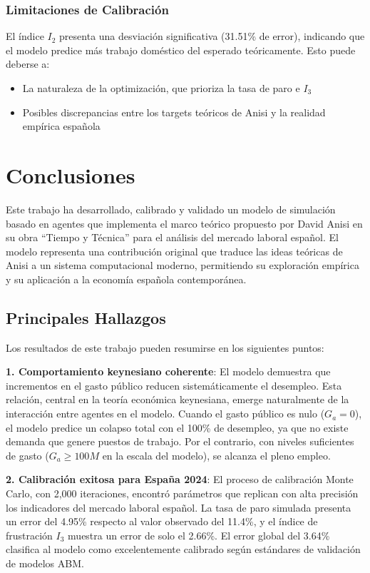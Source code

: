 \subsubsection{Limitaciones de Calibración}

El índice $I_2$ presenta una desviación significativa (31.51\% de error), indicando que el modelo predice más trabajo doméstico del esperado teóricamente. Esto puede deberse a:
\begin{itemize}
    \item La naturaleza de la optimización, que prioriza la tasa de paro e $I_3$
    \item Posibles discrepancias entre los targets teóricos de Anisi y la realidad empírica española
\end{itemize}


\section{Conclusiones}

Este trabajo ha desarrollado, calibrado y validado un modelo de simulación basado en agentes que implementa el marco teórico propuesto por David Anisi en su obra ``Tiempo y Técnica'' para el análisis del mercado laboral español. El modelo representa una contribución original que traduce las ideas teóricas de Anisi a un sistema computacional moderno, permitiendo su exploración empírica y su aplicación a la economía española contemporánea.

\subsection{Principales Hallazgos}

Los resultados de este trabajo pueden resumirse en los siguientes puntos:

\textbf{1. Comportamiento keynesiano coherente}: El modelo demuestra que incrementos en el gasto público reducen sistemáticamente el desempleo. Esta relación, central en la teoría económica keynesiana, emerge naturalmente de la interacción entre agentes en el modelo. Cuando el gasto público es nulo ($G_a = 0$), el modelo predice un colapso total con el 100\% de desempleo, ya que no existe demanda que genere puestos de trabajo. Por el contrario, con niveles suficientes de gasto ($G_a \geq 100M$ en la escala del modelo), se alcanza el pleno empleo.

\textbf{2. Calibración exitosa para España 2024}: El proceso de calibración Monte Carlo, con 2,000 iteraciones, encontró parámetros que replican con alta precisión los indicadores del mercado laboral español. La tasa de paro simulada presenta un error del 4.95\% respecto al valor observado del 11.4\%, y el índice de frustración $I_3$ muestra un error de solo el 2.66\%. El error global del 3.64\% clasifica al modelo como excelentemente calibrado según estándares de validación de modelos ABM.

